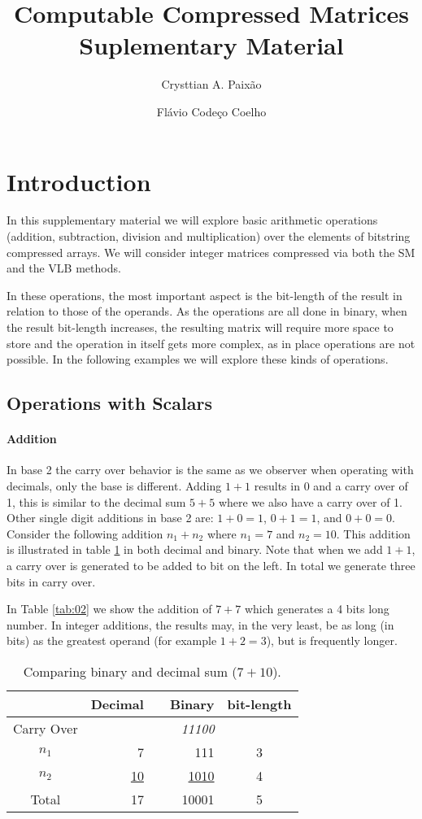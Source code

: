 \documentclass[12pt]{article}
\title{Computable Compressed Matrices\\Suplementary Material}
\author{Crysttian A. Paixão \and Flávio Codeço Coelho}
\begin{document}
\maketitle

\section{Introduction}

In this supplementary material we will explore basic arithmetic operations
(addition, subtraction, division and multiplication) over the elements of
bitstring compressed arrays. We will consider integer matrices compressed via
both the SM and the VLB methods.

In these operations, the most important aspect is the bit-length of the result
in relation to those of the operands. As the operations are all done in
binary, when the result bit-length increases, the resulting matrix will require
more space to store and the operation in itself gets more complex, as in place
operations are not possible. In the following examples we will explore these
kinds of operations.

\subsection{Operations with Scalars}

\paragraph{Addition}

In base 2 the carry over  behavior is the same as we observer when operating
with decimals, only the base is different. Adding $1+1$ results in $0$ and a
carry over of 1, this is similar to the decimal sum $5+5$ where we also have a
carry over of 1. Other single digit additions in base 2 are: $1 + 0
= 1$, $0 + 1 = 1$, and $0 + 0 = 0$. Consider the following addition $n_1+n_2$
where $n_1=7$ and $n_2=10$. This addition is illustrated in table \ref{tab:01}
in both decimal and binary. Note that when we add $1+1$, a carry over is
generated to be added to bit on the left. In total we generate three bits in
carry over.

In Table \ref{tab:02} we show the addition of $7 + 7$ which generates a 4 bits
long number. In integer additions, the results may, in the very least, be as
long (in bits) as the greatest operand (for example $1+2=3$), but is frequently
longer.

\begin{table}[ht]
	\centering
    \caption{Comparing binary and decimal sum ($7+10$).}
    \begin{tabular}{crrrc}
    \hline
    	  & Decimal & & Binary & bit-length \\
    \hline      
    Carry Over& 	& & \textit{11100} & \\
    $n_1$ & 7   & & 111 & 3 \\
    $n_2$ & \underline{10}	& & \underline{1010} & 4 \\
    Total & 17	& & 10001 & 5 \\
    \hline
	\end{tabular}
    \label{tab:01}
\end{table}
\end{document}
